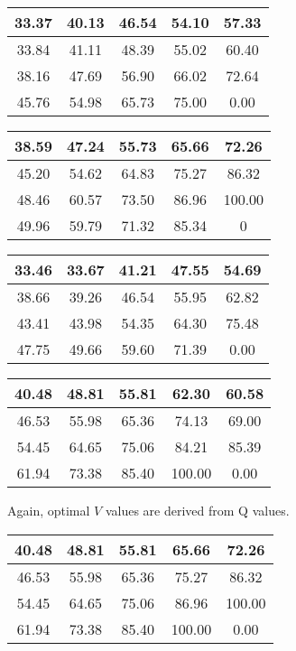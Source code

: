 \documentclass{article}
\begin{document}
\begin{table*}
\centering
\begin{tabular}{|c|c|c|c|c|}
\hline
33.37	&40.13	&46.54	&54.10	&57.33\\
\hline
33.84	&41.11	&48.39	&55.02	&60.40\\
\hline
38.16	&47.69	&56.90	&66.02	&72.64\\
\hline
45.76	&54.98	&65.73	&75.00	&0.00\\
\hline
\end{tabular}
\caption{Optimal Q values for action "up", Sarsa}	
\quad
\begin{tabular}{|c|c|c|c|c|}
\hline
38.59	&47.24	&55.73	&65.66	&72.26\\
\hline
45.20	&54.62	&64.83	&75.27	&86.32\\
\hline
48.46	&60.57	&73.50	&86.96	&100.00\\
\hline
49.96	&59.79	&71.32	&85.34 & 0	\\
\hline
\end{tabular}
\caption{Optimal Q values for action "down", Sarsa}	
\begin{tabular}{|c|c|c|c|c|}
\hline
33.46	&33.67&	41.21&	47.55	&54.69\\
\hline
38.66	&39.26&	46.54	&55.95	&62.82\\
\hline
43.41	&43.98	&54.35	&64.30	&75.48\\
\hline
47.75	&49.66	&59.60	&71.39	&0.00\\
\hline
\end{tabular}
\caption{Optimal Q values for action "left", Sarsa}	
\begin{tabular}{|c|c|c|c|c|}
\hline
40.48	&48.81	&55.81	&62.30	&60.58\\
\hline
46.53	&55.98	&65.36	&74.13	&69.00\\
\hline
54.45	&64.65	&75.06	&84.21	&85.39\\
\hline
61.94	&73.38	&85.40	&100.00	&0.00\\
\hline
\end{tabular}
\caption{Optimal Q values for action "right", Sarsa}	
\end{table*}

Again, optimal $V$ values are derived from Q values.

\begin{table*}
\centering
\begin{tabular}{|c|c|c|c|c|}
\hline
40.48	&48.81	&55.81	&65.66	&72.26\\
\hline
46.53	&55.98	&65.36&	75.27	&86.32\\
\hline
54.45	&64.65	&75.06	&86.96	&100.00\\
\hline
61.94&	73.38	&85.40&	100.00	&0.00\\
\hline
\end{tabular}
\caption{Optimal V values, Sarsa}	
\end{table*}
\end{document}
